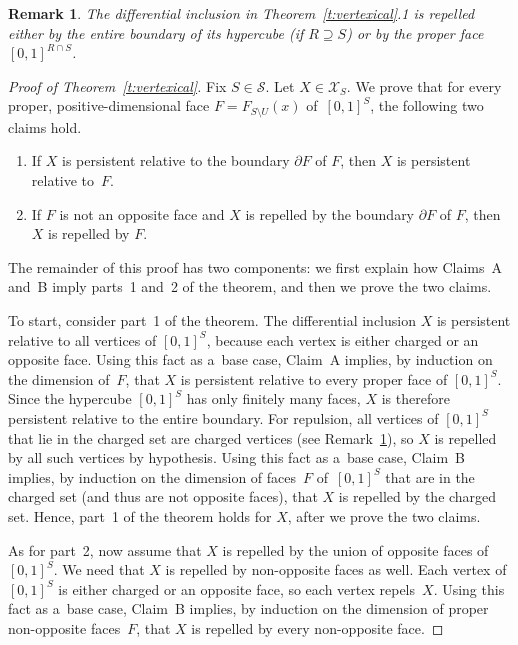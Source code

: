 \documentclass[11pt]{article}
\newtheorem{Remark}[Theorem]{Remark}
\begin{document}
\begin{Remark}
\label{r:chargedSet}
The dif\/ferential inclusion in Theorem~\ref{t:vertexical}.1 is repelled either by the entire boundary of its hypercube
(if $R\supseteq S$) or by the proper face $[0,1]^{R\cap S}$.
\end{Remark}
\begin{proof}[Proof of Theorem~\ref{t:vertexical}] Fix $S\in\mathcal S$.
Let $X\in\mathcal X_S$.
We prove that for every proper, positive-dimensional face $F=F_{S\setminus U}(x)$ of~$[0,1]^S$, the following two
claims hold.
\begin{enumerate}\itemsep=-0.5pt
 \item[A.] If $X$ is persistent relative to the boundary $\partial F$ of $F$, then $X$ is persistent relative to~$F$.
\item[B.]  If $F$ is not an opposite face and $X$ is repelled by the boundary $\partial F$ of $F$, then $X$ is repelled by
$F$.
\end{enumerate}
The remainder of this proof has two components: we f\/irst explain how Claims~A and~B imply parts~1 and~2 of the
theorem, and then we prove the two claims.

To start, consider part~1 of the theorem.
The dif\/ferential inclusion $X$ is persistent relative to all vertices of $[0,1]^S$, because each vertex is either
charged or an opposite face.
Using this fact as a~base case, Claim~A implies, by induction on the dimension of~$F$, that $X$ is persistent relative
to every proper face of $[0,1]^S$.
Since the hypercube $[0,1]^S$ has only f\/initely many faces, $X$ is therefore persistent relative to the entire
boundary.
For repulsion, all vertices of $[0,1]^S$ that lie in the charged set are charged vertices (see
Remark~\ref{r:chargedSet}), so $X$ is repelled by all such vertices by hypothesis.
Using this fact as a~base case, Claim~B implies, by induction on the dimension of faces~$F$ of~$[0,1]^S$ that are in
the charged set (and thus are not opposite faces), that $X$ is repelled by the charged set.
Hence, part~1 of the theorem holds for $X$, after we prove the two claims.

As for part~2, now assume that $X$ is repelled by the union of opposite faces of\/~$[0,1]^S$.
We need that $X$ is repelled by non-opposite faces as well.
Each vertex of $[0,1]^S$ is either charged or an opposite face, so each vertex repels~$X$.
Using this fact as a~base case, Claim~B implies, by induction on the dimension of proper non-opposite faces~$F$, that
$X$ is repelled by every non-opposite face.


\end{proof}
\end{document}
